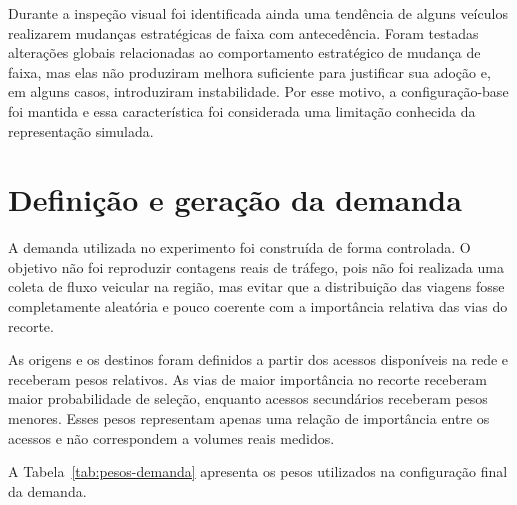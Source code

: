 Durante a inspeção visual foi identificada ainda uma tendência de alguns veículos realizarem mudanças estratégicas de faixa com antecedência. Foram testadas alterações globais relacionadas ao comportamento estratégico de mudança de faixa, mas elas não produziram melhora suficiente para justificar sua adoção e, em alguns casos, introduziram instabilidade. Por esse motivo, a configuração-base foi mantida e essa característica foi considerada uma limitação conhecida da representação simulada.

\section{Definição e geração da demanda}

A demanda utilizada no experimento foi construída de forma controlada. O objetivo não foi reproduzir contagens reais de tráfego, pois não foi realizada uma coleta de fluxo veicular na região, mas evitar que a distribuição das viagens fosse completamente aleatória e pouco coerente com a importância relativa das vias do recorte.

As origens e os destinos foram definidos a partir dos acessos disponíveis na rede e receberam pesos relativos. As vias de maior importância no recorte receberam maior probabilidade de seleção, enquanto acessos secundários receberam pesos menores. Esses pesos representam apenas uma relação de importância entre os acessos e não correspondem a volumes reais medidos.

A Tabela~\ref{tab:pesos-demanda} apresenta os pesos utilizados na configuração final da demanda.


